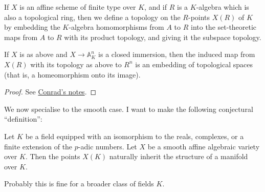 \begin{definition}\label{topology_on_affine_variety_points} If $X$ is an affine scheme of finite
    type over $K$, and if $R$ is a $K$-algebra which is also a topological ring, then we define a topology on the $R$-points $X(R)$ of $K$ by embedding the $K$-algebra homomorphisms from $A$ to $R$ into the set-theoretic maps from $A$ to $R$ with its product topology, and giving it the subspace topology.
\end{definition}

\begin{theorem}\label{topology_on_affine_variety_computation}
    If $X$ is as above and $X\to\mathbb{A}^n_K$ is a closed immersion, then the induced map from $X(R)$ with its topology as above to $R^n$ is an embedding of topological spaces (that is, a homeomorphism onto its image).
\end{theorem}
\begin{proof} See \href{https://math.stanford.edu/~conrad/papers/adelictop.pdf}{Conrad's notes}.
\end{proof}

We now specialise to the smooth case. I want to make the following conjectural ``definition'':
    
\begin{definition}\label{manifold_on_algebraic_variety_points}\notready Let $K$ be a field equipped with an isomorphism to the reals, complexes, or a finite extension of the $p$-adic numbers. Let $X$ be a smooth affine algebraic variety over $K$. Then the points $X(K)$ naturally inherit the structure of a manifold over $K$.
\end{definition}

\begin{remark} Probably this is fine for a broader class of fields $K$. 
\end{remark}

